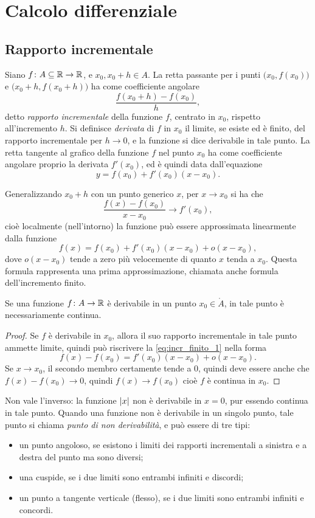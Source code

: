 \chapter{Calcolo differenziale}
\section{Rapporto incrementale}
Siano $f\colon A\subseteq\mathbb{R}\to\mathbb{R}$,  e $x_0,x_0+h\in A$. La retta passante per i punti $\big(x_0,f(x_0)\big)$ e $(x_0+h,f(x_0+h)\big)$ ha come coefficiente angolare
\begin{equation}
\label{eq:rapporto_incr}
\frac{f(x_0+h)-f(x_0)}{h},
\end{equation}
detto \emph{rapporto incrementale} della funzione $f$, centrato in $x_0$, rispetto all'incremento $h$.
Si definisce \emph{derivata} di $f$ in $x_0$ il limite, se esiste ed è finito, del rapporto incrementale per $h\to 0$, e la funzione si dice derivabile in tale punto. La retta tangente al grafico della funzione $f$ nel punto $x_0$ ha come coefficiente angolare proprio la derivata $f'(x_0)$, ed è quindi data dall'equazione
\begin{equation}
y=f(x_0)+f'(x_0)(x-x_0).
\end{equation}

Generalizzando $x_0+h$ con un punto generico $x$, per $x\to x_0$ si ha che
\[
\frac{f(x)-f(x_0)}{x-x_0}\to f'(x_0),
\]
cioè localmente (nell'intorno) la funzione può essere approssimata linearmente dalla funzione
\begin{equation}
\label{eq:incr_finito_1}
f(x)=f(x_0)+f'(x_0)(x-x_0)+o(x-x_0),
\end{equation}
dove $o(x-x_0)$ tende a zero più velocemente di quanto $x$ tenda a $x_0$. Questa formula rappresenta una prima approssimazione, chiamata anche formula dell'incremento finito.
\begin{teorema}
Se una funzione $f\colon A\to\mathbb{R}$ è derivabile in un punto $x_0\in\mathring{A}$, in tale punto è necessariamente continua.
\end{teorema}
\begin{proof}
Se $f$ è derivabile in $x_0$, allora il suo rapporto incrementale in tale punto ammette limite, quindi può riscrivere la \eqref{eq:incr_finito_1} nella forma
\[
f(x)-f(x_0)=f'(x_0)(x-x_0)+o(x-x_0).
\]
Se $x\to x_0$, il secondo membro certamente tende a 0, quindi deve essere anche che $f(x)-f(x_0)\to0$, quindi $f(x)\to f(x_0)$ cioè $f$ è continua in $x_0$.
\end{proof}
Non vale l'inverso: la funzione $\left|{x}\right|$ non è derivabile in $x=0$, pur essendo continua in tale punto.
Quando una funzione non è derivabile in un singolo punto, tale punto si chiama \emph{punto di non derivabilità}, e può essere di tre tipi:
\begin{itemize}
\item un punto angoloso, se esistono i limiti dei rapporti incrementali a sinistra e a destra del punto ma sono diversi;
\item una cuspide, se i due limiti sono entrambi infiniti e discordi;
\item un punto a tangente verticale (flesso), se i due limiti sono entrambi infiniti e concordi.
\end{itemize}
